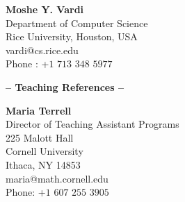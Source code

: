 \documentclass[a4paper]{article}
\def\tit#1{\medskip \begin{center}  {\Large {\bf -- #1 -- }} \end{center}}
\newif\ifcut
\begin{document}
{\bf Moshe Y. Vardi}\\
Department of Computer Science\\
Rice University, Houston, USA\\
vardi@cs.rice.edu\\
Phone : +$1$ $713$ $348$ $5977$\\


\ifcut
{\bf Anil Nerode}\\
Goldwin Smith Professor of Mathematics\\
545 Malott Hall\\
Cornell University\\
	 Ithaca, NY 14853\\
	 anil@math.cornell.edu\\
Phone: +$1$  $607$ $255$ $3577$\\
\fi
\tit{Teaching References}

{\bf Maria Terrell}\\
 Director of Teaching Assistant Programs\\
 	 225 Malott Hall \\
	 Cornell University\\
	 Ithaca, NY 14853\\
	 maria@math.cornell.edu\\
Phone: +$1$  $607$ $255$ $3905$\\

\ifcut
{\bf David Way}\\
Director of Instructional Support
Center for Teaching Excellence\\
420 D CCC\\
Cornell University\\
Ithaca, NY 14853\\
dgw2@cornell.edu\\
Phone: +$1$ $607$ $255$ $2663$\\
\fi
\end{document}
